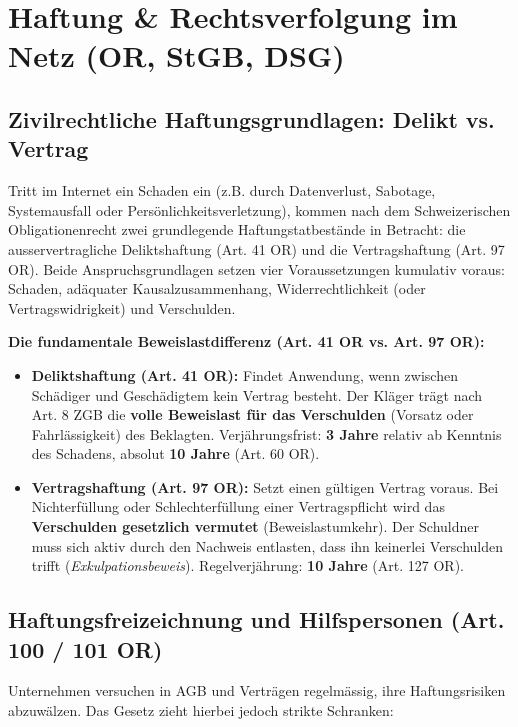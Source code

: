 \section{Haftung \& Rechtsverfolgung im Netz (OR, StGB, DSG)}

\subsection{Zivilrechtliche Haftungsgrundlagen: Delikt vs. Vertrag}

Tritt im Internet ein Schaden ein (z.B. durch Datenverlust, Sabotage, Systemausfall oder Persönlichkeitsverletzung), kommen nach dem Schweizerischen Obligationenrecht zwei grundlegende Haftungstatbestände in Betracht: die ausservertragliche Deliktshaftung (Art. 41 OR) und die Vertragshaftung (Art. 97 OR). Beide Anspruchsgrundlagen setzen vier Voraussetzungen kumulativ voraus: Schaden, adäquater Kausalzusammenhang, Widerrechtlichkeit (oder Vertragswidrigkeit) und Verschulden.

\begin{theorem}
    \textbf{Die fundamentale Beweislastdifferenz (Art. 41 OR vs. Art. 97 OR):}
    \begin{itemize}
        \item \textbf{Deliktshaftung (Art. 41 OR):} Findet Anwendung, wenn zwischen Schädiger und Geschädigtem kein Vertrag besteht. Der Kläger trägt nach Art. 8 ZGB die \textbf{volle Beweislast für das Verschulden} (Vorsatz oder Fahrlässigkeit) des Beklagten. Verjährungsfrist: \textbf{3 Jahre} relativ ab Kenntnis des Schadens, absolut \textbf{10 Jahre} (Art. 60 OR).
        \item \textbf{Vertragshaftung (Art. 97 OR):} Setzt einen gültigen Vertrag voraus. Bei Nichterfüllung oder Schlechterfüllung einer Vertragspflicht wird das \textbf{Verschulden gesetzlich vermutet} (Beweislastumkehr). Der Schuldner muss sich aktiv durch den Nachweis entlasten, dass ihn keinerlei Verschulden trifft (\textit{Exkulpationsbeweis}). Regelverjährung: \textbf{10 Jahre} (Art. 127 OR).
    \end{itemize}
\end{theorem}

\subsection{Haftungsfreizeichnung und Hilfspersonen (Art. 100 / 101 OR)}

Unternehmen versuchen in AGB und Verträgen regelmässig, ihre Haftungsrisiken abzuwälzen. Das Gesetz zieht hierbei jedoch strikte Schranken:

